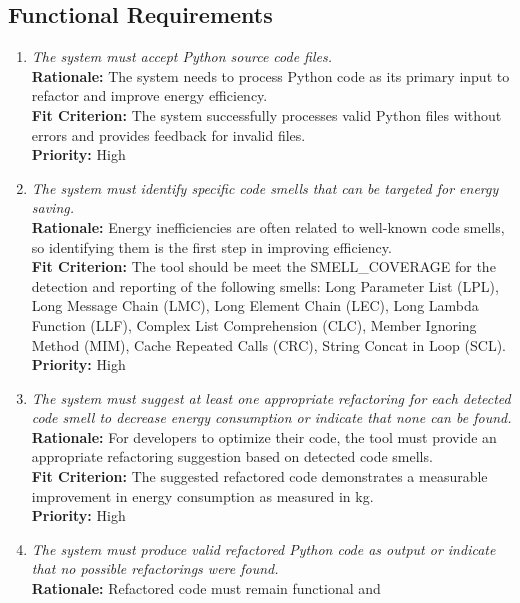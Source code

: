 \documentclass[12pt]{article}
\begin{document}
\subsection{Functional Requirements}
\begin{enumerate}[label=FR \arabic*., wide=0pt, leftmargin=*]
  \item \emph{The system must accept Python source code files.}\\[2mm]
    {\bf Rationale:} The system needs to process Python code as its
    primary input to refactor and improve energy efficiency.\\
    {\bf Fit Criterion:} The system successfully processes valid
    Python files without errors and provides feedback for invalid files.\\
    {\bf Priority:} High
  \item \emph{The system must identify specific code smells that can
    be targeted for energy saving.}\\[2mm]
    {\bf Rationale:} Energy inefficiencies are often related to
    well-known code smells, so identifying them is the first step in
    improving efficiency.\\
    {\bf Fit Criterion:} The tool should be meet the SMELL\_COVERAGE
    for the detection and reporting of the following smells: Long
    Parameter List (LPL), Long Message Chain (LMC), Long Element
    Chain (LEC), Long Lambda Function (LLF), Complex List
    Comprehension (CLC), Member Ignoring Method (MIM), Cache Repeated Calls (CRC),
    String Concat in Loop (SCL).\\
    {\bf Priority:} High
  \item \emph{The system must suggest at least one appropriate
      refactoring for each detected code smell to decrease energy
    consumption or indicate that none can be found.}\\[2mm]
    {\bf Rationale:} For developers to optimize their code, the tool
    must provide an appropriate refactoring suggestion based on
    detected code smells.\\
    {\bf Fit Criterion:} The suggested refactored code demonstrates a
    measurable improvement in energy consumption as measured in kg.\\
    {\bf Priority:} High
  \item \emph{The system must produce valid refactored Python code as
    output or indicate that no possible refactorings were found.}\\[2mm]
    {\bf Rationale:} Refactored code must remain functional and

\end{enumerate}
\end{document}
